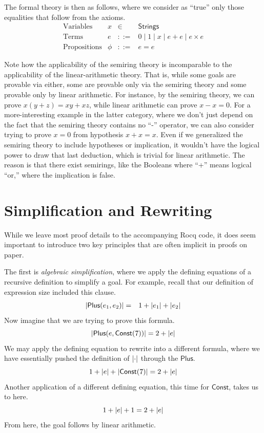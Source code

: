 \documentclass{amsbook}
\theoremstyle{definition}
\theoremstyle{remark}
\numberwithin{section}{chapter}
\numberwithin{equation}{chapter}
\begin{document}
The formal theory is then as follows, where we consider as ``true'' only those equalities that follow from the axioms.
$$\begin{array}{rrcl}
  \textrm{Variables} & x &\in& \mathsf{Strings} \\
  \textrm{Terms} & e &::=& 0 \mid 1 \mid x \mid e + e \mid e \times e \\
  \textrm{Propositions} & \phi &::=& e = e
\end{array}$$

Note how the applicability of the semiring theory is incomparable to the applicability of the linear-arithmetic theory.
That is, while some goals are provable via either, some are provable only via the semiring theory and some provable only by linear arithmetic.
For instance, by the semiring theory, we can prove $x(y + z) = xy + xz$, while linear arithmetic can prove $x - x = 0$.
For a more-interesting example in the latter category, where we don't just depend on the fact that the semiring theory contains no ``-'' operator, we can also consider trying to prove $x = 0$ from hypothesis $x + x = x$.
Even if we generalized the semiring theory to include hypotheses or implication, it wouldn't have the logical power to draw that last deduction, which is trivial for linear arithmetic.
The reason is that there exist semirings, like the Booleans where ``+'' means logical ``or,'' where the implication is false.

\section{Simplification and Rewriting}

While we leave most proof details to the accompanying Rocq code, it does seem important to introduce two key principles that are often implicit in proofs on paper.

The first is \emph{algebraic simplification}, where we apply the defining equations of a recursive definition to simplify a goal.
For example, recall that our definition of expression size included this clause.
\begin{eqnarray*}
  {\left \lvert \mathsf{Plus}(e_1, e_2) \right \rvert} &=& 1 + {\left \lvert e_1 \right \rvert} + {\left \lvert e_2 \right \rvert}
\end{eqnarray*}
Now imagine that we are trying to prove this formula.
$${\left \lvert \mathsf{Plus}(e, \mathsf{Const}(7)) \right \rvert} = 2 + {\left \lvert e \right \rvert}$$
We may apply the defining equation to rewrite into a different formula, where we have essentially pushed the definition of ${\left \lvert \cdot \right \rvert}$ through the $\mathsf{Plus}$.
$$1 + {\left \lvert e \right \rvert} + {\left \lvert \mathsf{Const}(7) \right \rvert} = 2 + {\left \lvert e \right \rvert}$$
Another application of a different defining equation, this time for $\mathsf{Const}$, takes us to here.
$$1 + {\left \lvert e \right \rvert} + 1 = 2 + {\left \lvert e \right \rvert}$$
From here, the goal follows by linear arithmetic.
\end{document}
